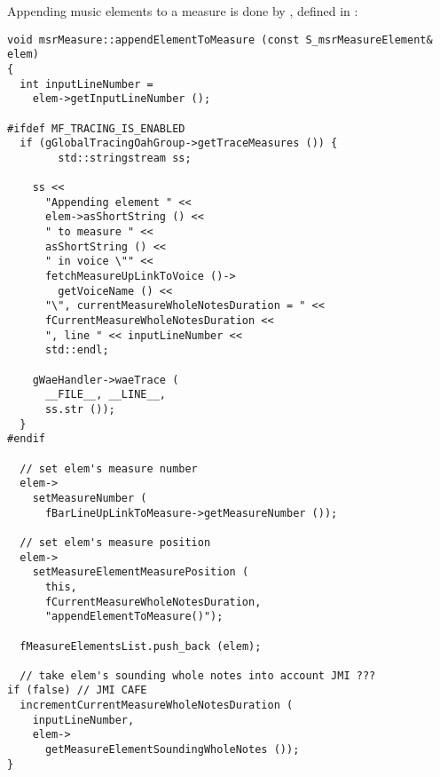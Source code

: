 Appending music elements to a measure is done by , defined in :%
\begin{lstlisting}[language=CPlusPlus]
void msrMeasure::appendElementToMeasure (const S_msrMeasureElement& elem)
{
  int inputLineNumber =
    elem->getInputLineNumber ();

#ifdef MF_TRACING_IS_ENABLED
  if (gGlobalTracingOahGroup->getTraceMeasures ()) {
		std::stringstream ss;

    ss <<
      "Appending element " <<
      elem->asShortString () <<
      " to measure " <<
      asShortString () <<
      " in voice \"" <<
      fetchMeasureUpLinkToVoice ()->
        getVoiceName () <<
      "\", currentMeasureWholeNotesDuration = " <<
      fCurrentMeasureWholeNotesDuration <<
      ", line " << inputLineNumber <<
      std::endl;

    gWaeHandler->waeTrace (
      __FILE__, __LINE__,
      ss.str ());
  }
#endif

  // set elem's measure number
  elem->
    setMeasureNumber (
      fBarLineUpLinkToMeasure->getMeasureNumber ());

  // set elem's measure position
  elem->
    setMeasureElementMeasurePosition (
      this,
      fCurrentMeasureWholeNotesDuration,
      "appendElementToMeasure()");

  fMeasureElementsList.push_back (elem);

  // take elem's sounding whole notes into account JMI ???
if (false) // JMI CAFE
  incrementCurrentMeasureWholeNotesDuration (
    inputLineNumber,
    elem->
      getMeasureElementSoundingWholeNotes ());
}
\end{lstlisting}

